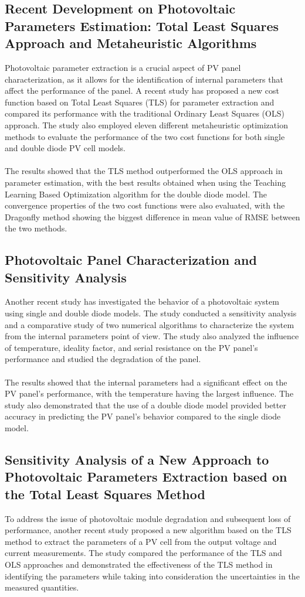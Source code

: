 \documentclass{report}
\begin{document}
\subsection{Recent Development on Photovoltaic Parameters Estimation: Total Least Squares Approach and Metaheuristic Algorithms}
Photovoltaic parameter extraction is a crucial aspect of PV panel characterization, as it allows for the identification of internal parameters that affect the performance of the panel. A recent study has proposed a new cost function based on Total Least Squares (TLS) for parameter extraction and compared its performance with the traditional Ordinary Least Squares (OLS) approach. The study also employed eleven different metaheuristic optimization methods to evaluate the performance of the two cost functions for both single and double diode PV cell models.\\
\\
The results showed that the TLS method outperformed the OLS approach in parameter estimation, with the best results obtained when using the Teaching Learning Based Optimization algorithm for the double diode model. The convergence properties of the two cost functions were also evaluated, with the Dragonfly method showing the biggest difference in mean value of RMSE between the two methods\cite{RDPP}.
\subsection{Photovoltaic Panel Characterization and Sensitivity Analysis}
Another recent study has investigated the behavior of a photovoltaic system using single and double diode models. The study conducted a sensitivity analysis and a comparative study of two numerical algorithms to characterize the system from the internal parameters point of view. The study also analyzed the influence of temperature, ideality factor, and serial resistance on the PV panel's performance and studied the degradation of the panel.\\
\\
The results showed that the internal parameters had a significant effect on the PV panel's performance, with the temperature having the largest influence. The study also demonstrated that the use of a double diode model provided better accuracy in predicting the PV panel's behavior compared to the single diode model\cite{PVCS}.
\subsection{Sensitivity Analysis of a New Approach to Photovoltaic Parameters Extraction based on the Total Least Squares Method}
To address the issue of photovoltaic module degradation and subsequent loss of performance, another recent study proposed a new algorithm based on the TLS method to extract the parameters of a PV cell from the output voltage and current measurements. The study compared the performance of the TLS and OLS approaches and demonstrated the effectiveness of the TLS method in identifying the parameters while taking into consideration the uncertainties in the measured quantities\cite{SANPV}.
\end{document}
